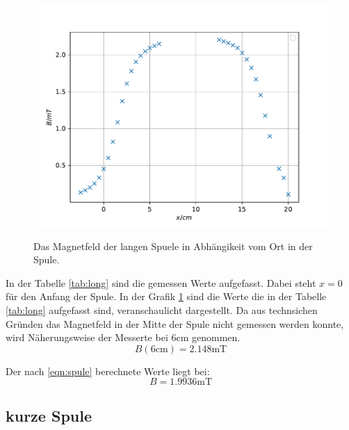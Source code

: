 \begin{figure}
  \centering
  \caption{Das Magnetfeld der langen Spuele in Abhängikeit vom Ort in der Spule.}
  \includegraphics[width=\textwidth]{content/data/plot_long.pdf}
  \label{fig:long}
\end{figure}

In der Tabelle \ref{tab:long} sind die gemessen Werte aufgefasst.
Dabei steht $x=0$ für den Anfang der Spule.
In der Grafik \ref{fig:long} sind die Werte die in der Tabelle \ref{tab:long} aufgefasst sind, veranschaulicht dargestellt.
Da aus technsichen Gründen das Magnetfeld in der Mitte der Spule nicht gemessen werden konnte, wird Näherungsweise der Messerte bei $6 \si{\centi\meter}$ genommen.
\begin{equation*}
  B(6\si{\centi\meter}) = 2.148 \si{\milli\tesla} 
\end{equation*}

Der nach \eqref{eqn:spule} berechnete Werte liegt bei:
\begin{equation*}
  B = 1.9936 \si{\milli\tesla} 
\end{equation*}

\FloatBarrier
\subsection{kurze Spule}

